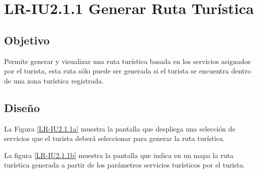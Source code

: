 \newpage
\section{LR-IU2.1.1 Generar Ruta Turística}

\subsection{Objetivo}
Permite generar y visualizar una ruta turística basada en los servicios asignados por el turista, esta ruta sólo puede ser generada si el turista se encuentra dentro de una zona turística registrada.

\subsection{Diseño}
La Figura \ref{LR-IU2.1.1a} muestra la pantalla  que despliega una selección de servicios que el turista deberá seleccionar para generar la ruta turística. 


\newpage
La figura \ref{LR-IU2.1.1b} muestra la pantalla  que indica en un mapa la ruta turística generada a partir de los parámetros servicios turísticos por el turista.
